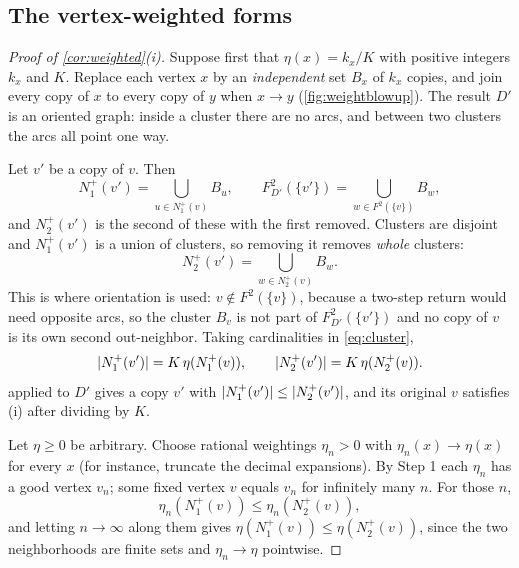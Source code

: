 
\subsection{The vertex-weighted forms}\label{sec:vertex-weighted}

\begin{proof}[Proof of \cref{cor:weighted}(i)]
 Suppose first that $\eta(x)=k_x/K$ with positive integers
$k_x$ and $K$. Replace each vertex $x$ by an \emph{independent} set $B_x$ of $k_x$ copies, and join
every copy of $x$ to every copy of $y$ when $x\to y$ (\cref{fig:weightblowup}). The result $D'$ is
an oriented graph: inside a cluster there are no arcs, and between two clusters the arcs all point
one way.

Let $v'$ be a copy of $v$. Then
\[
 N_1^+(v')=\bigcup_{u\in N_1^+(v)}B_u,\qquad
 F_{D'}^2(\{v'\})=\bigcup_{w\in F^2(\{v\})}B_w ,
\]
and $N_2^+(v')$ is the second of these with the first removed. Clusters are disjoint and $N_1^+(v')$
is a union of clusters, so removing it removes \emph{whole} clusters:
\begin{equation}\label{eq:cluster}
 N_2^+(v')=\bigcup_{w\in N_2^+(v)}B_w .
\end{equation}
This is where orientation is used: $v\notin F^2(\{v\})$, because a two-step return would need
opposite arcs, so the cluster $B_v$ is not part of $F^2_{D'}(\{v'\})$ and no copy of $v$ is its own
second out-neighbor. Taking cardinalities in \eqref{eq:cluster},
\[
 \lvert N_1^+(v')\rvert=K\,\eta(N_1^+(v)),\qquad \lvert N_2^+(v')\rvert=K\,\eta(N_2^+(v)) .
\]
 applied to $D'$ gives a copy $v'$ with $\lvert N_1^+(v')\rvert\le\lvert N_2^+(v')\rvert$, and its
original $v$ satisfies (i) after dividing by $K$.

 Let $\eta\ge0$ be arbitrary. Choose rational weightings
$\eta_n>0$ with $\eta_n(x)\to\eta(x)$ for every $x$ (for instance, truncate the decimal expansions).
By Step 1 each $\eta_n$ has a good vertex $v_n$; some fixed vertex $v$ equals $v_n$ for infinitely
many $n$. For those $n$,
\[
 \eta_n(N_1^+(v))\le\eta_n(N_2^+(v)),
\]
and letting $n\to\infty$ along them gives $\eta(N_1^+(v))\le\eta(N_2^+(v))$, since the two
neighborhoods are finite sets and $\eta_n\to\eta$ pointwise.
\end{proof}

